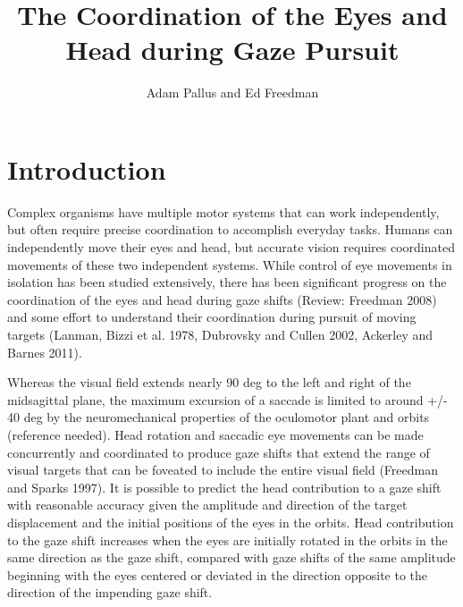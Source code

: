 \documentclass[12pt]{article}
\title{The Coordination of the Eyes and Head during Gaze Pursuit}
\author{Adam Pallus and Ed Freedman}
\begin{document}
\date{}
\maketitle

\begin{abstract}

\end{abstract}

\section{Introduction}
Complex organisms have multiple motor systems that can work independently, but often require precise coordination to accomplish everyday tasks. Humans can independently move their eyes and head, but accurate vision requires coordinated movements of these two independent systems. While control of eye movements in isolation has been studied extensively, there has been significant progress on the coordination of the eyes and head during gaze shifts (Review: Freedman 2008) and some effort to understand their coordination during pursuit of moving targets (Lanman, Bizzi et al. 1978, Dubrovsky and Cullen 2002, Ackerley and Barnes 2011).

Whereas the visual field extends nearly 90 deg to the left and right of the midsagittal plane, the maximum excursion of a saccade is limited to around +/- 40 deg by the neuromechanical properties of the oculomotor plant and orbits (reference needed). Head rotation and saccadic eye movements can be made concurrently and coordinated to produce gaze shifts that extend the range of visual targets that can be foveated to include the entire visual field (Freedman and Sparks 1997). It is possible to predict the head contribution to a gaze shift with reasonable accuracy given the amplitude and direction of the target displacement and the initial positions of the eyes in the orbits. Head contribution to the gaze shift increases when the eyes are initially rotated in the orbits in the same direction as the gaze shift, compared with gaze shifts of the same amplitude beginning with the eyes centered or deviated in the direction opposite to the direction of the impending gaze shift.
\end{document}
